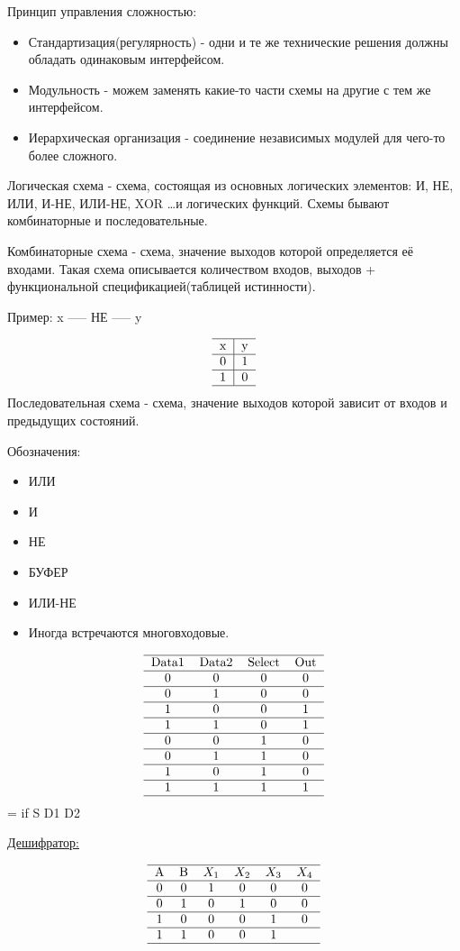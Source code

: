 Принцип управления сложностью:
\begin{itemize}
	\item Стандартизация(регулярность) - одни и те же технические решения должны обладать одинаковым интерфейсом.
	\item Модульность - можем заменять какие-то части схемы на другие с тем же интерфейсом.
	\item Иерархическая организация - соединение независимых модулей для чего-то более сложного.
\end{itemize}

Логическая схема - схема, состоящая из основных логических элементов: И, НЕ, ИЛИ, И-НЕ, ИЛИ-НЕ, XOR \dots и логических функций. 
Схемы бывают комбинаторные и последовательные.

Комбинаторные схема - схема, значение выходов которой определяется её входами. Такая схема описывается количеством входов, выходов + функциональной
спецификацией(таблицей истинности).

Пример: x ----- НЕ ----- y 

\[
\begin{tabular}{c | c}
\hline
x & y \\
\hline
0 & 1 \\
\hline
1 & 0 \\
\hline
\end{tabular}
\]
Последовательная схема - схема, значение выходов которой зависит от входов и предыдущих состояний.

Обозначения:
\begin{itemize}
	\item ИЛИ
	\item И
	\item НЕ
	\item БУФЕР
	\item ИЛИ-НЕ
	\item Иногда встречаются многовходовые.
\end{itemize}



\[
	\begin{tabular}{cccc}
	\hline
	Data1&Data2&Select&Out \\
	\hline
	0&0&0&0 \\
	\hline 
	0&1&0&0 \\
	\hline
	1&0&0&1 \\
	\hline
	1&1&0&1 \\
	\hline
	0&0&1&0 \\
	\hline
	0&1&1&0 \\
	\hline
	1&0&1&0 \\
	\hline
	1&1&1&1 \\
	\hline
	\end{tabular}
\]    = if S D1 D2


\underline{Дешифратор:}


\[
	\begin{tabular}{cccccc}
	\hline
	A&B&$X_1$&$X_2$&$X_3$&$X_4$ \\
	\hline
	0&0&1&0&0&0 \\
	\hline
	0&1&0&1&0&0 \\
	\hline
	1&0&0&0&1&0 \\
	\hline
	1&1&0&0&1 \\
	\hline
	\end{tabular}
\]